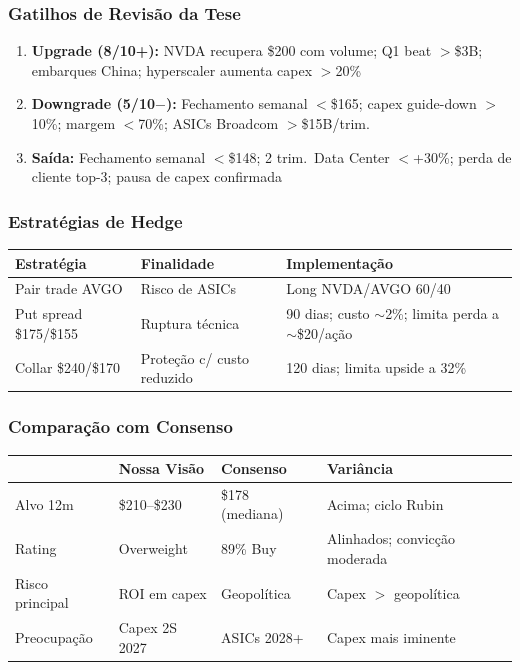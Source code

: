 \documentclass[11pt,a4paper]{article}
\begin{document}
\subsubsection{Gatilhos de Revis\~ao da Tese}

\begin{enumerate}[nosep]
  \item \textbf{Upgrade (8/10+):} NVDA recupera \$200 com volume; Q1 beat $>$\$3B; embarques China; hyperscaler aumenta capex $>$20\%
  \item \textbf{Downgrade (5/10$-$):} Fechamento semanal $<$\$165; capex guide-down $>$10\%; margem $<$70\%; ASICs Broadcom $>$\$15B/trim.
  \item \textbf{Sa\'ida:} Fechamento semanal $<$\$148; 2 trim.\ Data Center $<$+30\%; perda de cliente top-3; pausa de capex confirmada
\end{enumerate}

\subsubsection{Estrat\'egias de Hedge}

\begin{table}[h]
\centering
\begin{tabularx}{\textwidth}{lXX}
\toprule
\textbf{Estrat\'egia} & \textbf{Finalidade} & \textbf{Implementa\c{c}\~ao} \\
\midrule
Pair trade AVGO & Risco de ASICs & Long NVDA/AVGO 60/40 \\
Put spread \$175/\$155 & Ruptura t\'ecnica & 90 dias; custo $\sim$2\%; limita perda a $\sim$\$20/a\c{c}\~ao \\
Collar \$240/\$170 & Prote\c{c}\~ao c/ custo reduzido & 120 dias; limita upside a 32\% \\
\bottomrule
\end{tabularx}
\end{table}

\subsubsection{Compara\c{c}\~ao com Consenso}

\begin{table}[h]
\centering
\begin{tabularx}{\textwidth}{lXXX}
\toprule
& \textbf{Nossa Vis\~ao} & \textbf{Consenso} & \textbf{Vari\^ancia} \\
\midrule
Alvo 12m & \$210--\$230 & \$178 (mediana) & Acima; ciclo Rubin \\
Rating & Overweight & 89\% Buy & Alinhados; convic\c{c}\~ao moderada \\
Risco principal & ROI em capex & Geopol\'itica & Capex $>$ geopol\'itica \\
Preocupa\c{c}\~ao & Capex 2S 2027 & ASICs 2028+ & Capex mais iminente \\
\bottomrule
\end{tabularx}
\end{table}
\end{document}
